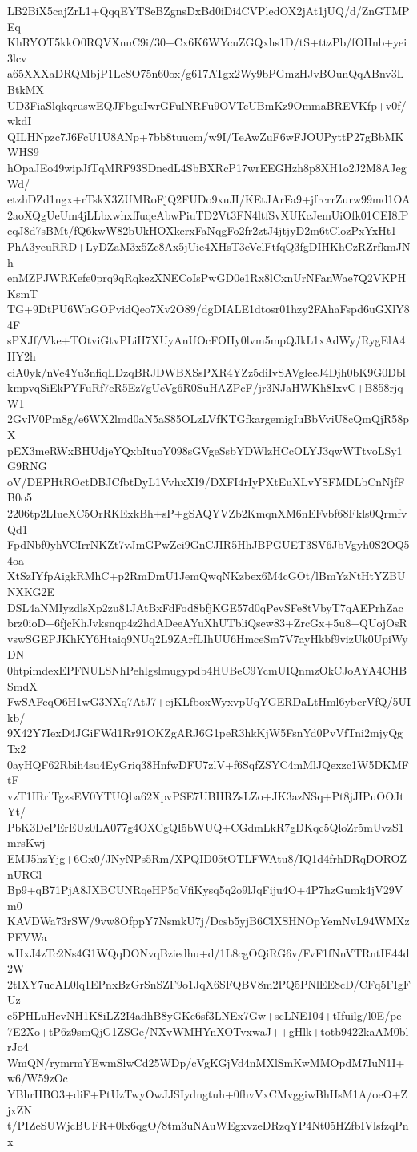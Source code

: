 LB2BiX5cajZrL1+QqqEYTSeBZgnsDxBd0iDi4CVPledOX2jAt1jUQ/d/ZnGTMPEq
KhRYOT5kkO0RQVXnuC9i/30+Cx6K6WYcuZGQxhs1D/tS+ttzPb/fOHnb+yei3lcv
a65XXXaDRQMbjP1LcSO75n60ox/g617ATgx2Wy9bPGmzHJvBOunQqABnv3LBtkMX
UD3FiaSlqkqruswEQJFbguIwrGFulNRFu9OVTcUBmKz9OmmaBREVKfp+v0f/wkdI
QILHNpzc7J6FcU1U8ANp+7bb8tuucm/w9I/TeAwZuF6wFJOUPyttP27gBbMKWHS9
hOpaJEo49wipJiTqMRF93SDnedL4SbBXRcP17wrEEGHzh8p8XH1o2J2M8AJegWd/
etzhDZd1ngx+rTskX3ZUMRoFjQ2FUDo9xuJI/KEtJArFa9+jfrcrrZurw99md1OA
2aoXQgUeUm4jLLbxwhxffuqeAbwPiuTD2Vt3FN4ltfSvXUKcJemUiOfk01CEI8fP
cqJ8d7sBMt/fQ6kwW82bUkHOXkcrxFaNqgFo2fr2ztJ4jtjyD2m6tClozPxYxHt1
PhA3yeuRRD+LyDZaM3x5Zc8Ax5jUie4XHsT3eVclFtfqQ3fgDIHKhCzRZrfkmJNh
enMZPJWRKefe0prq9qRqkezXNECoIsPwGD0e1Rx8lCxnUrNFanWae7Q2VKPHKsmT
TG+9DtPU6WhGOPvidQeo7Xv2O89/dgDIALE1dtosr01hzy2FAhaFspd6uGXlY84F
sPXJf/Vke+TOtviGtvPLiH7XUyAnUOcFOHy0lvm5mpQJkL1xAdWy/RygElA4HY2h
ciA0yk/nVe4Yu3nfiqLDzqBRJDWBXSsPXR4YZz5diIvSAVgleeJ4Djh0bK9G0Dbl
kmpvqSiEkPYFuRf7eR5Ez7gUeVg6R0SuHAZPcF/jr3NJaHWKh8IxvC+B858rjqW1
2GvlV0Pm8g/e6WX2lmd0aN5aS85OLzLVfKTGfkargemigIuBbVviU8cQmQjR58pX
pEX3meRWxBHUdjeYQxbItuoY098sGVgeSsbYDWlzHCcOLYJ3qwWTtvoLSy1G9RNG
oV/DEPHtROctDBJCfbtDyL1VvhxXI9/DXFI4rIyPXtEuXLvYSFMDLbCnNjfFB0o5
2206tp2LIueXC5OrRKExkBh+sP+gSAQYVZb2KmqnXM6nEFvbf68Fkls0QrmfvQd1
FpdNbf0yhVCIrrNKZt7vJmGPwZei9GnCJIR5HhJBPGUET3SV6JbVgyh0S2OQ54oa
XtSzIYfpAigkRMhC+p2RmDmU1JemQwqNKzbex6M4cGOt/lBmYzNtHtYZBUNXKG2E
DSL4aNMIyzdlsXp2zu81JAtBxFdFod8bfjKGE57d0qPevSFe8tVbyT7qAEPrhZac
brz0ioD+6fjcKhJvksnqp4z2hdADeeAYuXhUTbliQsew83+ZrcGx+5u8+QUojOsR
vswSGEPJKhKY6Htaiq9NUq2L9ZArfLIhUU6HmceSm7V7ayHkbf9vizUk0UpiWyDN
0htpimdexEPFNULSNhPehlgslmugypdb4HUBeC9YcmUIQnmzOkCJoAYA4CHBSmdX
FwSAFcqO6H1wG3NXq7AtJ7+ejKLfboxWyxvpUqYGERDaLtHml6ybcrVfQ/5UIkb/
9X42Y7IexD4JGiFWd1Rr91OKZgARJ6G1peR3hkKjW5FsnYd0PvVfTni2mjyQgTx2
0ayHQF62Rbih4su4EyGriq38HnfwDFU7zlV+f6SqfZSYC4mMlJQexzc1W5DKMFtF
vzT1IRrlTgzsEV0YTUQba62XpvPSE7UBHRZsLZo+JK3azNSq+Pt8jJIPuOOJtYt/
PbK3DePErEUz0LA077g4OXCgQI5bWUQ+CGdmLkR7gDKqc5QloZr5mUvzS1mrsKwj
EMJ5hzYjg+6Gx0/JNyNPs5Rm/XPQID05tOTLFWAtu8/IQ1d4frhDRqDOROZnURGl
Bp9+qB71PjA8JXBCUNRqeHP5qVfiKysq5q2o9lJqFiju4O+4P7hzGumk4jV29Vm0
KAVDWa73rSW/9vw8OfppY7NsmkU7j/Dcsb5yjB6ClXSHNOpYemNvL94WMXzPEVWa
wHxJ4zTc2Ns4G1WQqDONvqBziedhu+d/1L8cgOQiRG6v/FvF1fNnVTRntIE44d2W
2tIXY7ucAL0lq1EPnxBzGrSnSZF9o1JqX6SFQBV8m2PQ5PNlEE8cD/CFq5FIgFUz
e5PHLuHcvNH1K8iLZ2I4adhB8yGKc6sf3LNEx7Gw+scLNE104+tIfuilg/l0E/pe
7E2Xo+tP6z9smQjG1ZSGe/NXvWMHYnXOTvxwaJ++gHlk+totb9422kaAM0blrJo4
WmQN/rymrmYEwmSlwCd25WDp/cVgKGjVd4nMXlSmKwMMOpdM7IuN1I+w6/W59zOc
YBhrHBO3+diF+PtUzTwyOwJJSIydngtuh+0fhvVxCMvggiwBhHsM1A/oeO+ZjxZN
t/PIZeSUWjcBUFR+0lx6qgO/8tm3uNAuWEgxvzeDRzqYP4Nt05HZfbIVlsfzqPnx
